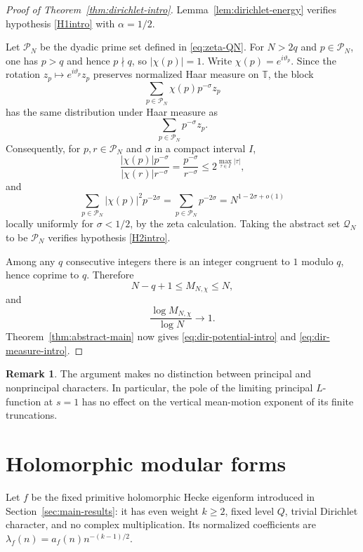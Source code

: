 \documentclass[11pt]{article}
\theoremstyle{definition}
\newtheorem{remark}[theorem]{Remark}
\newcommand{\T}{\mathbb T}
\newcommand{\1}{\mathbf 1}
\begin{document}
\begin{proof}[Proof of Theorem~\ref{thm:dirichlet-intro}]
Lemma~\ref{lem:dirichlet-energy} verifies hypothesis \ref{H1intro} with $\alpha=1/2$.

Let $\mathcal P_N$ be the dyadic prime set defined in \eqref{eq:zeta-QN}.  For $N>2q$ and $p\in\mathcal P_N$, one has $p>q$ and hence $p\nmid q$, so $|\chi(p)|=1$.  Write $\chi(p)=e^{i\vartheta_p}$.  Since the rotation $z_p\mapsto e^{i\vartheta_p}z_p$ preserves normalized Haar measure on $\T$, the block
\[
\sum_{p\in\mathcal P_N}\chi(p)p^{-\sigma}z_p
\]
has the same distribution under Haar measure as
\[
\sum_{p\in\mathcal P_N}p^{-\sigma}z_p.
\]
Consequently, for $p,r\in\mathcal P_N$ and $\sigma$ in a compact interval $I$,
\[
\frac{|\chi(p)|p^{-\sigma}}{|\chi(r)|r^{-\sigma}}
=\frac{p^{-\sigma}}{r^{-\sigma}}
\le2^{\max_{\tau\in I}|\tau|},
\]
and
\[
\sum_{p\in\mathcal P_N}|\chi(p)|^2p^{-2\sigma}
=\sum_{p\in\mathcal P_N}p^{-2\sigma}
=N^{1-2\sigma+o(1)}
\]
locally uniformly for $\sigma<1/2$, by the zeta calculation.  Taking the abstract set $\mathcal Q_N$ to be $\mathcal P_N$ verifies hypothesis \ref{H2intro}.

Among any $q$ consecutive integers there is an integer congruent to $1$ modulo $q$, hence coprime to $q$.  Therefore
\begin{equation}\label{eq:MN-dir}
N-q+1\le M_{N,\chi}\le N,
\end{equation}
and
\[
\frac{\log M_{N,\chi}}{\log N}\longrightarrow1.
\]
Theorem~\ref{thm:abstract-main} now gives \eqref{eq:dir-potential-intro} and \eqref{eq:dir-measure-intro}.
\end{proof}

\begin{remark}\label{rem:principal-character}
The argument makes no distinction between principal and nonprincipal characters.  In particular, the pole of the limiting principal $L$-function at $s=1$ has no effect on the vertical mean-motion exponent of its finite truncations.
\end{remark}

\section{Holomorphic modular forms}\label{sec:modular}

Let $f$ be the fixed primitive holomorphic Hecke eigenform introduced in Section~\ref{sec:main-results}: it has even weight $k\ge2$, fixed level $Q$, trivial Dirichlet character, and no complex multiplication.  Its normalized coefficients are $\lambda_f(n)=a_f(n)n^{-(k-1)/2}$.
\end{document}

